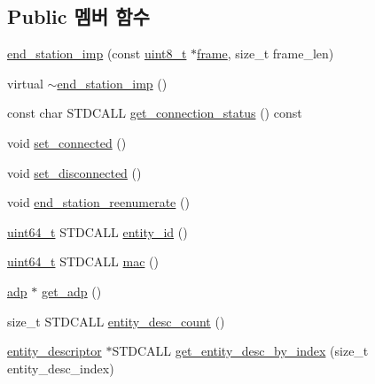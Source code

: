 \subsection*{Public 멤버 함수}
\begin{DoxyCompactItemize}
\item 
\hyperlink{classavdecc__lib_1_1end__station__imp_a4d219a92ae6270d47ba29d3315ef0f7c}{end\+\_\+station\+\_\+imp} (const \hyperlink{stdint_8h_aba7bc1797add20fe3efdf37ced1182c5}{uint8\+\_\+t} $\ast$\hyperlink{gst__avb__playbin_8c_ac8e710e0b5e994c0545d75d69868c6f0}{frame}, size\+\_\+t frame\+\_\+len)
\item 
virtual \hyperlink{classavdecc__lib_1_1end__station__imp_a18e7d6cee404186d41ef7883e5c51b1d}{$\sim$end\+\_\+station\+\_\+imp} ()
\item 
const char S\+T\+D\+C\+A\+LL \hyperlink{classavdecc__lib_1_1end__station__imp_a57761ed81e93fb30fa77f8f555409309}{get\+\_\+connection\+\_\+status} () const 
\item 
void \hyperlink{classavdecc__lib_1_1end__station__imp_a883c6853df95abc5470ac6ef67dea685}{set\+\_\+connected} ()
\item 
void \hyperlink{classavdecc__lib_1_1end__station__imp_a5c157d065f315a4becb4c315289a3f62}{set\+\_\+disconnected} ()
\item 
void \hyperlink{classavdecc__lib_1_1end__station__imp_ac0261f128375a81d95acbc19ac243215}{end\+\_\+station\+\_\+reenumerate} ()
\item 
\hyperlink{parse_8c_aec6fcb673ff035718c238c8c9d544c47}{uint64\+\_\+t} S\+T\+D\+C\+A\+LL \hyperlink{classavdecc__lib_1_1end__station__imp_a363b6c9664a0d701def9b17863e20ad3}{entity\+\_\+id} ()
\item 
\hyperlink{parse_8c_aec6fcb673ff035718c238c8c9d544c47}{uint64\+\_\+t} S\+T\+D\+C\+A\+LL \hyperlink{classavdecc__lib_1_1end__station__imp_a08e1bd1861b3b8f447ea374a65ac11f9}{mac} ()
\item 
\hyperlink{classavdecc__lib_1_1adp}{adp} $\ast$ \hyperlink{classavdecc__lib_1_1end__station__imp_a471a74540ce6182fad0c17dfd010107e}{get\+\_\+adp} ()
\item 
size\+\_\+t S\+T\+D\+C\+A\+LL \hyperlink{classavdecc__lib_1_1end__station__imp_a644ad4750f4dbb93a86345be02feab68}{entity\+\_\+desc\+\_\+count} ()
\item 
\hyperlink{classavdecc__lib_1_1entity__descriptor}{entity\+\_\+descriptor} $\ast$S\+T\+D\+C\+A\+LL \hyperlink{classavdecc__lib_1_1end__station__imp_a2039add3a7eb753152149e07a86ad008}{get\+\_\+entity\+\_\+desc\+\_\+by\+\_\+index} (size\+\_\+t entity\+\_\+desc\+\_\+index)

\end{DoxyCompactItemize}
